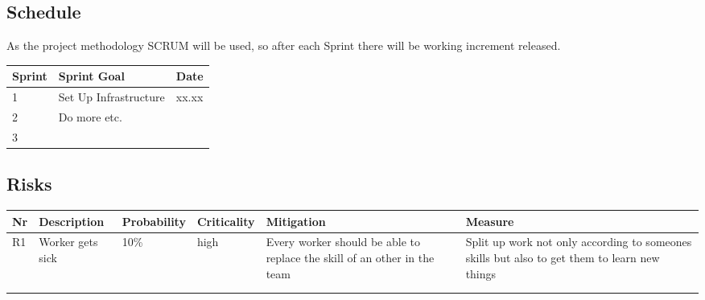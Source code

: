 \subsection{Schedule}
As the project methodology SCRUM will be used, so after each Sprint there will be  working increment released.

\begin{table}[htb!]
\begin{tabular}{lll}
\textbf{Sprint} & \textbf{Sprint Goal} & \textbf{Date} \\
\hline
1      & Set Up Infrastructure & xx.xx \\
2      & Do more etc.          &            \\
3       &                       &           
\end{tabular}
\end{table}

\subsection{Risks}
\begin{table}[htb!]
\begin{tabularx}{\textwidth}{llllXX}
\textbf{Nr} & \textbf{Description} & \textbf{Probability} & \textbf{Criticality} & \textbf{Mitigation}                                                      & \textbf{Measure}                                                                             \\
\hline
R1          & Worker gets sick     & 10\%                 & high                 & Every worker should be able to replace the skill of an other in the team & Split up work not only according to someones skills but also to get them to learn new things \\
            &                      &                      &                      &                                                                          &                                                                                              \\
            &                      &                      &                      &                                                                          &                                                                                             
\end{tabularx}
\end{table}
